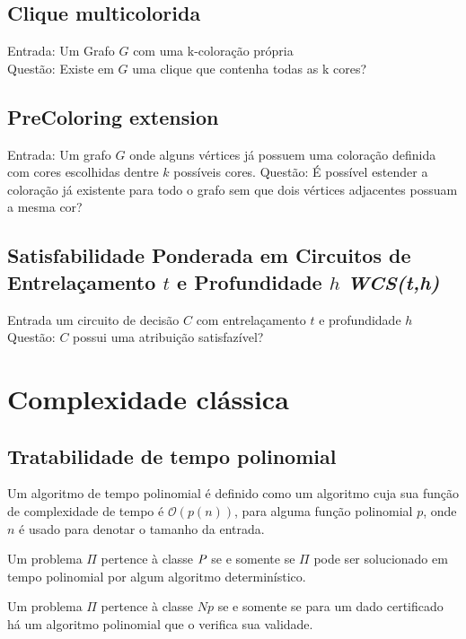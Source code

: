 \subsection{Clique multicolorida}
\begin{definition}
 Entrada: Um Grafo $G$ com uma k-coloração própria\\
 Questão: Existe em $G$ uma clique que contenha todas as k cores?
\end{definition}

\subsection{PreColoring extension}
\begin{definition}
 Entrada: Um grafo $G$ onde alguns vértices já possuem uma coloração definida com cores escolhidas dentre $k$ possíveis cores.
 Questão: É possível estender a coloração já existente para todo o grafo sem que dois vértices adjacentes possuam a mesma cor? 
\end{definition}

\subsection{Satisfabilidade Ponderada em Circuitos de Entrelaçamento $t$ e Profundidade $h$ \emph{WCS(t,h)}}
\begin{definition}
 Entrada um circuito de decisão $C$ com entrelaçamento $t$ e profundidade $h$\\
 Questão: $C$ possui uma atribuição satisfazível?
\end{definition}

\section{Complexidade clássica}
\subsection{Tratabilidade de tempo polinomial}
Um algoritmo de tempo polinomial é definido como um algoritmo cuja sua função de complexidade de tempo é $\mathcal{O}(p(n))$, para alguma função polinomial $p$, onde $n$ é usado para denotar o tamanho da entrada.

Um problema $\Pi$ pertence à classe $\P$ se e somente se $\Pi$ pode ser solucionado em tempo polinomial por algum algoritmo determinístico.

Um problema $\Pi$ pertence à classe $\textit{Np}$ se e somente se para um dado certificado há um algoritmo polinomial que o verifica sua validade.

